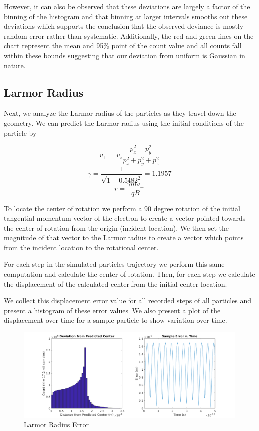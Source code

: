 \documentclass[12pt,letterpaper]{article}
\begin{document}
However, it can also be observed that these deviations are largely a factor of the binning of the histogram and that binning at larger intervals smooths out these deviations which supports the conclusion that the observed deviance is mostly random error rather than systematic. Additionally, the red and green lines on the chart represent the mean and 95\% point of the count value and all counts fall within these bounds suggesting that our deviation from uniform is Gaussian in nature.

\subsection{Larmor Radius}

Next, we analyze the Larmor radius of the particles as they travel down the geometry. We can predict the Larmor radius using the initial conditions of the particle by

\[ v_{\perp} = v_z\frac{p_x^2 + p_y^2}{p_x^2 + p_y^2 + p_z^2} \]
\[ \gamma = \frac{1}{\sqrt{1 - 0.5482^2}} = 1.1957 \]
\[ r = \frac{\gamma mv_\perp}{qB}  \]

To locate the center of rotation we perform a 90 degree rotation of the initial tangential momentum vector of the electron to create a vector pointed towards the center of rotation from the origin (incident location). We then set the magnitude of that vector to the Larmor radius to create a vector which points from the incident location to the rotational center.

For each step in the simulated particles trajectory we perform this same computation and calculate the center of rotation. Then, for each step we calculate the displacement of the calculated center from the initial center location. 

We collect this displacement error value for all recorded steps of all particles and present a histogram of these error values. We also present a plot of the displacement over time for a sample particle to show variation over time.

    \begin{figure}[H]
    \centering
    \includegraphics[width=\linewidth]{img/larmor.png}
    \caption{Larmor Radius Error}
    \end{figure}
    
\end{document}
